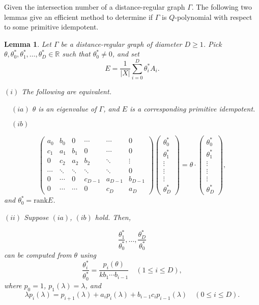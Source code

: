 \documentclass[
]{book}
\newtheorem{lemma}{Lemma}[chapter]
\theoremstyle{definition}
\theoremstyle{definition}
\theoremstyle{definition}
\theoremstyle{definition}
\theoremstyle{remark}
\begin{document}
Given the intersection number of a distance-regular graph \(\Gamma\). The following two lemmas give an efficient method to determine if \(\Gamma\) is \(Q\)-polynomial with respect to some primitive idempotent.

\begin{lemma}
\protect\hypertarget{lem:dual-eigenvalues}{}\label{lem:dual-eigenvalues}Let \(\Gamma\) be a distance-regular graph of diameter \(D\geq 1\).
Pick \(\theta, \theta^*_0, \theta^*_1, \ldots, \theta^*_D\in \mathbb{R}\) such that \(\theta^*_0 \neq 0\), and set
\[E = \frac{1}{|X|}\sum_{i=0}^D\theta^*_iA_i.\]

\((i)\) The following are equivalent.

\(\quad (ia)\) \(\theta\) is an eigenvalue of \(\Gamma\), and \(E\) is a corresponding primitive idempotent.

\(\quad (ib)\)

\[\begin{pmatrix} a_0 & b_0 & 0 & \cdots & \cdots & 0\\
c_1 & a_1 & b_1 & 0 & \cdots & 0\\
0 & c_2 & a_2 & b_2 & \ddots & \vdots\\
\cdots & \ddots & \ddots & \ddots & \ddots & 0 \\
0 & \cdots & 0 & c_{D-1} & a_{D-1} & b_{D-1}\\
0 & \cdots & \cdots & 0 & c_D & a_D 
\end{pmatrix} \begin{pmatrix} \theta^*_0\\\theta^*_1\\\vdots \\\vdots \\\vdots\\ \theta^*_D\end{pmatrix} = \theta\cdot \begin{pmatrix} \theta^*_0\\\theta^*_1\\\vdots\\\vdots\\ \vdots \\ \theta^*_D\end{pmatrix},
\]
and \(\theta^*_0 = \mathrm{rank}E\).

\((ii)\) Suppose \((ia)\), \((ib)\) hold. Then,

\[\frac{\theta^*_1}{\theta^*_0}, \ldots, \frac{\theta^*_D}{\theta^*_0}\]
can be computed from \(\theta\) using
\[\frac{\theta^*_i}{\theta^*_0} = \frac{p_i(\theta)}{kb_1\cdots b_{i-1}} \quad (1\leq i\leq D),\]
where \(p_0 = 1\), \(p_1(\lambda) = \lambda\), and
\[\lambda p_i(\lambda) = p_{i+1}(\lambda) + a_ip_i(\lambda) + b_{i-1}c_ip_{i-1}(\lambda)\quad (0\leq i\leq D).\]
\end{lemma}
\end{document}
